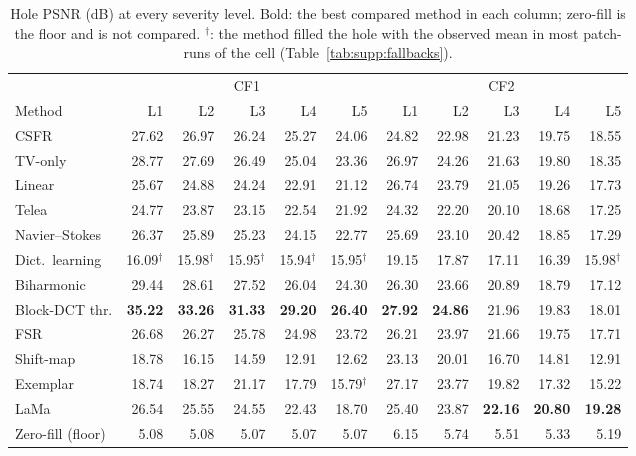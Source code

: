 \documentclass[11pt]{article}
\begin{document}
\begin{table}[htbp]
\centering
\caption{Hole PSNR (dB) at every severity level. Bold: the best compared method in each column; zero-fill is the floor and is not compared. $^{\dagger}$: the method filled the hole with the observed mean in most patch-runs of the cell (Table~\ref{tab:supp:fallbacks}).}
\label{tab:supp:psnr}
\footnotesize
\setlength{\tabcolsep}{4pt}
\begin{tabular}{@{}l*{10}{r}@{}}
\toprule
 & \multicolumn{5}{c}{CF1} & \multicolumn{5}{c}{CF2} \\
\cmidrule(lr){2-6}\cmidrule(l){7-11}
Method & L1 & L2 & L3 & L4 & L5 & L1 & L2 & L3 & L4 & L5 \\
\midrule
CSFR & 27.62 & 26.97 & 26.24 & 25.27 & 24.06 & 24.82 & 22.98 & 21.23 & 19.75 & 18.55 \\
TV-only & 28.77 & 27.69 & 26.49 & 25.04 & 23.36 & 26.97 & 24.26 & 21.63 & 19.80 & 18.35 \\
Linear & 25.67 & 24.88 & 24.24 & 22.91 & 21.12 & 26.74 & 23.79 & 21.05 & 19.26 & 17.73 \\
Telea & 24.77 & 23.87 & 23.15 & 22.54 & 21.92 & 24.32 & 22.20 & 20.10 & 18.68 & 17.25 \\
Navier--Stokes & 26.37 & 25.89 & 25.23 & 24.15 & 22.77 & 25.69 & 23.10 & 20.42 & 18.85 & 17.29 \\
Dict.\ learning & 16.09$^{\dagger}$ & 15.98$^{\dagger}$ & 15.95$^{\dagger}$ & 15.94$^{\dagger}$ & 15.95$^{\dagger}$ & 19.15 & 17.87 & 17.11 & 16.39 & 15.98$^{\dagger}$ \\
Biharmonic & 29.44 & 28.61 & 27.52 & 26.04 & 24.30 & 26.30 & 23.66 & 20.89 & 18.79 & 17.12 \\
Block-DCT thr. & \textbf{35.22} & \textbf{33.26} & \textbf{31.33} & \textbf{29.20} & \textbf{26.40} & \textbf{27.92} & \textbf{24.86} & 21.96 & 19.83 & 18.01 \\
FSR & 26.68 & 26.27 & 25.78 & 24.98 & 23.72 & 26.21 & 23.97 & 21.66 & 19.75 & 17.71 \\
Shift-map & 18.78 & 16.15 & 14.59 & 12.91 & 12.62 & 23.13 & 20.01 & 16.70 & 14.81 & 12.91 \\
Exemplar & 18.74 & 18.27 & 21.17 & 17.79 & 15.79$^{\dagger}$ & 27.17 & 23.77 & 19.82 & 17.32 & 15.22 \\
LaMa & 26.54 & 25.55 & 24.55 & 22.43 & 18.70 & 25.40 & 23.87 & \textbf{22.16} & \textbf{20.80} & \textbf{19.28} \\
\midrule
Zero-fill (floor) & 5.08 & 5.08 & 5.07 & 5.07 & 5.07 & 6.15 & 5.74 & 5.51 & 5.33 & 5.19 \\

\end{tabular}
\end{table}
\end{document}

